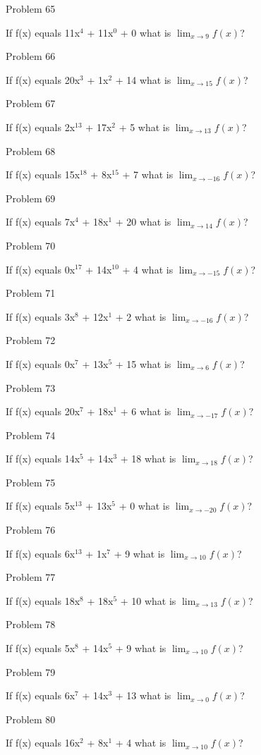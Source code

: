 \documentclass{article}
\begin{document}
Problem 65

If f(x) equals 11x$^{4}$ + 11x$^{0}$ + 0 what is $\lim_{x\to 9} f(x) $?

Problem 66

If f(x) equals 20x$^{3}$ + 1x$^{2}$ + 14 what is $\lim_{x\to 15} f(x) $?

Problem 67

If f(x) equals 2x$^{13}$ + 17x$^{2}$ + 5 what is $\lim_{x\to 13} f(x) $?

Problem 68

If f(x) equals 15x$^{18}$ + 8x$^{15}$ + 7 what is $\lim_{x\to -16} f(x) $?

Problem 69

If f(x) equals 7x$^{4}$ + 18x$^{1}$ + 20 what is $\lim_{x\to 14} f(x) $?

Problem 70

If f(x) equals 0x$^{17}$ + 14x$^{10}$ + 4 what is $\lim_{x\to -15} f(x) $?

Problem 71

If f(x) equals 3x$^{8}$ + 12x$^{1}$ + 2 what is $\lim_{x\to -16} f(x) $?

Problem 72

If f(x) equals 0x$^{7}$ + 13x$^{5}$ + 15 what is $\lim_{x\to 6} f(x) $?

Problem 73

If f(x) equals 20x$^{7}$ + 18x$^{1}$ + 6 what is $\lim_{x\to -17} f(x) $?

Problem 74

If f(x) equals 14x$^{5}$ + 14x$^{3}$ + 18 what is $\lim_{x\to 18} f(x) $?

Problem 75

If f(x) equals 5x$^{13}$ + 13x$^{5}$ + 0 what is $\lim_{x\to -20} f(x) $?

Problem 76

If f(x) equals 6x$^{13}$ + 1x$^{7}$ + 9 what is $\lim_{x\to 10} f(x) $?

Problem 77

If f(x) equals 18x$^{8}$ + 18x$^{5}$ + 10 what is $\lim_{x\to 13} f(x) $?

Problem 78

If f(x) equals 5x$^{8}$ + 14x$^{5}$ + 9 what is $\lim_{x\to 10} f(x) $?

Problem 79

If f(x) equals 6x$^{7}$ + 14x$^{3}$ + 13 what is $\lim_{x\to 0} f(x) $?

Problem 80

If f(x) equals 16x$^{2}$ + 8x$^{1}$ + 4 what is $\lim_{x\to 10} f(x) $?
\end{document}
